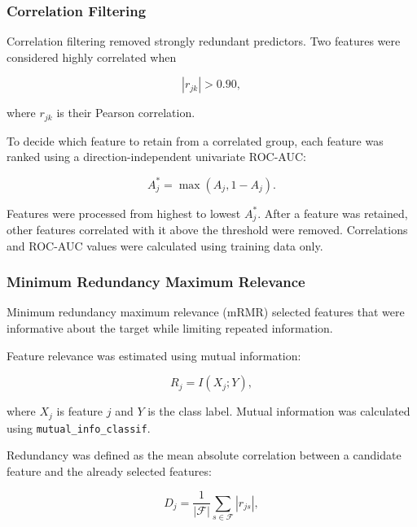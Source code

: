 \documentclass[12pt,twocolumn]{article}
\begin{document}
\subsubsection{Correlation Filtering}
\label{subsubsec:correlation_filtering}

Correlation filtering removed strongly redundant predictors. Two
features were considered highly correlated when

\begin{equation}
\left|r_{jk}\right|>0.90,
\label{eq:correlation_threshold}
\end{equation}

where \(r_{jk}\) is their Pearson correlation.

To decide which feature to retain from a correlated group, each
feature was ranked using a direction-independent univariate ROC-AUC:

\begin{equation}
A^{*}_{j}=\max(A_j,1-A_j).
\label{eq:direction_independent_auc}
\end{equation}

Features were processed from highest to lowest \(A^{*}_{j}\). After a
feature was retained, other features correlated with it above the
threshold were removed. Correlations and ROC-AUC values were calculated
using training data only.

\subsubsection{Minimum Redundancy Maximum Relevance}
\label{subsubsec:mrmr}

Minimum redundancy maximum relevance (mRMR) selected features that were
informative about the target while limiting repeated information.

Feature relevance was estimated using mutual information:

\begin{equation}
R_j=I(X_j;Y),
\label{eq:mrmr_relevance}
\end{equation}

where \(X_j\) is feature \(j\) and \(Y\) is the class label. Mutual
information was calculated using
\texttt{mutual\_info\_classif}.

Redundancy was defined as the mean absolute correlation between a
candidate feature and the already selected features:

\begin{equation}
D_j=
\frac{1}{|\mathcal{F}|}
\sum_{s\in\mathcal{F}}
|r_{js}|,
\label{eq:mrmr_redundancy}
\end{equation}
\end{document}
